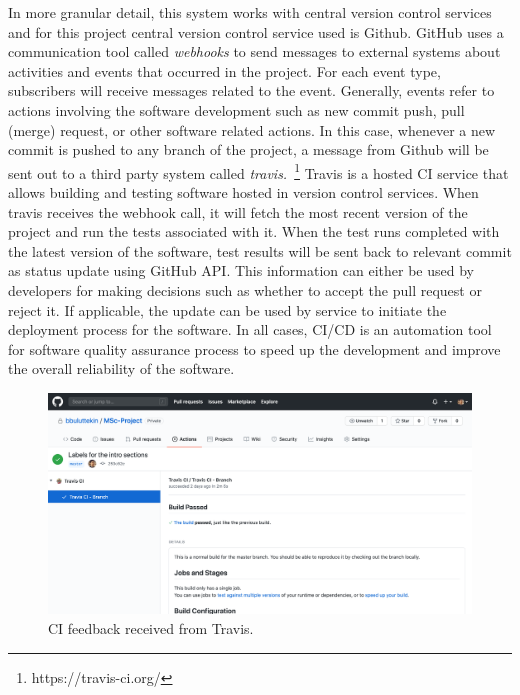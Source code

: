 In more granular detail, this system works with central version control services and for this project central version control service used is Github. GitHub uses a communication tool called \emph{webhooks} to send messages to external systems about activities and events that occurred in the project. For each event type, subscribers will receive messages related to the event. Generally, events refer to actions involving the software development such as new commit push, pull (merge) request, or other software related actions. In this case, whenever a new commit is pushed to any branch of the project, a message from Github will be sent out to a third party system called \emph{travis.}~\footnote{https://travis-ci.org/} Travis is a hosted CI service that allows building and testing software hosted in version control services. When travis receives the webhook call, it will fetch the most recent version of the project and run the tests associated with it. When the test runs completed with the latest version of the software, test results will be sent back to relevant commit as status update using GitHub API. This information can either be used by developers for making decisions such as whether to accept the pull request or reject it. If applicable, the update can be used by service to initiate the deployment process for the software. In all cases, CI/CD is an automation tool for software quality assurance process to speed up the development and improve the overall reliability of the software.

\begin{figure}[H]
    \centering
    \includegraphics[width=\textwidth]{img/cigithub.png}
    \caption{CI feedback received from Travis.}
    \label{fig:cigithub}
\end{figure}
 


